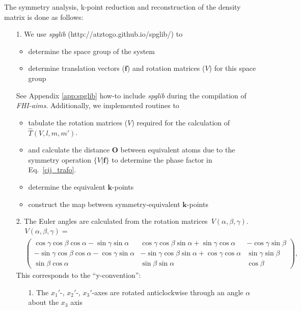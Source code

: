 The symmetry analysis, k-point reduction and reconstruction of the density matrix is done as follows:
\begin{enumerate}
 \item[1.] We use \textit{spglib} (http://atztogo.github.io/spglib/) to
\begin{itemize}
 \item determine the space group of the system               
 \item determine translation vectors ($\mathbf{f}$) and rotation matrices ($V$) for this space group
\end{itemize}
See Appendix \ref{app:spglib} how-to include \textit{spglib} during the compilation of \textit{FHI-aims}.  
Additionally, we implemented routines to
\begin{itemize}
 \item tabulate the rotation matrices ($V$) required for the calculation of $\hat{T}(V,l,m,m')$.
 \item and calculate the distance $\mathbf{O}$ between equivalent atoms due to the symmetry operation $\{V|\mathbf{f}\}$ to determine the phase factor in Eq.~\ref{cij_trafo}.
 \item determine the equivalent $\mathbf{k}$-points 
 \item construct the map between symmetry-equivalent $\mathbf{k}$-points
\end{itemize}
 \item[2.] The Euler angles are calculated from the rotation matrices~$V(\alpha,\beta,\gamma)$.
    \begin{align*}
    &V(\alpha,\beta,\gamma)=\\
    &\left(\begin{matrix}
     \cos\gamma\cos\beta\cos\alpha-\sin\gamma\sin\alpha &
     \cos\gamma\cos\beta\sin\alpha+\sin\gamma\cos\alpha &
    -\cos\gamma\sin\beta \\
    -\sin\gamma\cos\beta\cos\alpha-\cos\gamma\sin\alpha &
    -\sin\gamma\cos\beta\sin\alpha+\cos\gamma\cos\alpha &
     \sin\gamma\sin\beta \\
     \sin\beta\cos\alpha &
     \sin\beta\sin\alpha &
     \cos\beta
    \end{matrix}\right),
   \end{align*}
This  corresponds to the ``y-convention'':
   \begin{itemize}
    \item[1.]{The $x_1'$-, $x_2'$-, $x_3'$-axes are rotated anticlockwise
     through an angle $\alpha$ about the $x_3$ axis}

\end{itemize}
\end{enumerate}
